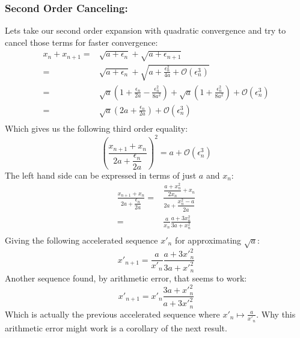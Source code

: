 \subsubsection{Second Order Canceling:}
Lets take our second order expansion with quadratic convergence and try to cancel those terms for faster convergence:
\begin{equation*}
\begin{aligned}
	x_{n} +x_{n+1}= & \sqrt{a+\epsilon_n} +\sqrt{a+\epsilon_{n+1}}\\
	=& \sqrt{a+\epsilon_n}+\sqrt{a+\frac{\epsilon_n^2}{4a}+\mathcal{O}(\epsilon_n^3)}\\
	=& \sqrt{a}\left(1+\frac{\epsilon_n}{2a}-\frac{\epsilon_n^2}{8a^2}\right) +\sqrt{a}\left(1+\frac{\epsilon_n^2}{8a^2}\right) +\mathcal{O}(\epsilon_n^3)\\
	=& \sqrt{a}\left(2a + \frac{\epsilon_n}{2a}\right) +\mathcal{O}(\epsilon_n^3)\\
\end{aligned}
\end{equation*}
Which gives us the following third order equality:
\[\left(\frac{x_{n+1}+x_n}{2a + \dfrac{\epsilon_n}{2a}}\right)^2=a+\mathcal{O}(\epsilon_n^3) \]
The left hand side can be expressed in terms of just $a$ and $x_n$:
\begin{equation*}
\begin{aligned}
	\frac{x_{n+1}+x_n}{2a + \dfrac{\epsilon_n}{2a}}= & \frac{\dfrac{a+x_n^2}{2x_n}+x_n}{2a + \dfrac{x_n^2-a}{2a}} \\
	= &\frac{a}{x_n} \frac{a+3x^2_n}{3a + x_n^2} \\
\end{aligned}
\end{equation*}
Giving the following accelerated sequence $x'_n$ for approximating $\sqrt{a}$:
\[x'_{n+1} = \frac{a}{x'_n} \frac{a+3x'^2_n}{3a + x'^2_n} \]
Another sequence found, by arithmetic error, that seems to work:
\[x'_{n+1} = x'_n\frac{3a+x'^2_n}{a+3x'^2_n}\]
Which is actually the previous accelerated sequence where $x'_n\mapsto \frac{a}{x'_{n}}$.
Why this arithmetic error might work is a corollary of the next result.

